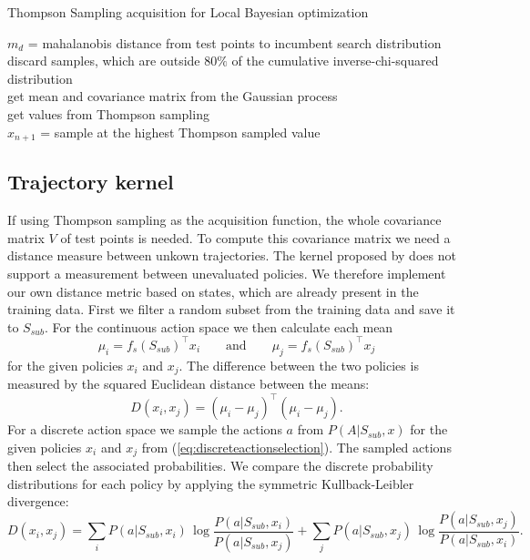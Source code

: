 \begin{algorithm}
    \caption{Thompson Sampling acquisition for Local Bayesian optimization\label{alg:acqLocalBO}}
    \BlankLine

    $m_d$ = mahalanobis distance from test points to incumbent search distribution\\
    discard samples, which are outside $80\%$ of the cumulative inverse-chi-squared distribution\\
    get mean and covariance matrix from the Gaussian process\\
    get values from Thompson sampling\\
    $x_{n+1}$ = sample at the highest Thompson sampled value\\
\end{algorithm}

\subsection{Trajectory kernel}
If using Thompson sampling as the acquisition function, the whole covariance matrix $V$ of test points is needed. To compute this covariance matrix we need a distance measure between unkown trajectories. The kernel proposed by \cite{wilson2014using} does not support a measurement between unevaluated policies. We therefore implement our own distance metric based on states, which are already present in the training data. First we filter a random subset from the training data and save it to $S_{sub}$. For the continuous action space we then calculate each mean
$$\mu_i = f_s(S_{sub})^\top x_i \qquad \text{and}\qquad \mu_j = f_s(S_{sub})^\top x_j$$
for the given policies $x_i$ and $x_j$. The difference between the two policies is measured by the squared Euclidean distance between the means:
$$D(x_i,x_j) = (\mu_i - \mu_j)^\top (\mu_i - \mu_j).$$
For a discrete action space we sample the actions $a$ from $P(A|S_{sub},x)$ for the given policies $x_i$ and $x_j$ from (\ref{eq:discreteactionselection}). The sampled actions then select the associated probabilities. We compare the discrete probability distributions for each policy by applying the symmetric Kullback-Leibler divergence:
$$D(x_i,x_j) = \sum _{i}P(a|S_{sub},x_i)\,\log {\frac {P(a|S_{sub},x_i)}{P(a|S_{sub},x_j)}} + \sum _{j}P(a|S_{sub},x_j)\,\log {\frac {P(a|S_{sub},x_j)}{P(a|S_{sub},x_i)}}.$$

